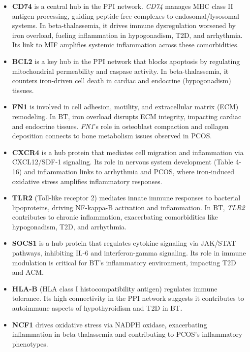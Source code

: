 \begin{itemize}
    \item \textbf{CD74} is a central hub in the PPI network. \textit{CD74} manages MHC class II antigen processing, guiding peptide-free complexes to endosomal/lysosomal systems. In beta-thalassemia, it drives immune dysregulation worsened by iron overload, fueling inflammation in hypogonadism, T2D, and arrhythmia. Its link to MIF amplifies systemic inflammation across these comorbidities.
    
    \item \textbf{BCL2} is a key hub in the PPI network that blocks apoptosis by regulating mitochondrial permeability and caspase activity. In beta-thalassemia, it counters iron-driven cell death in cardiac and endocrine (hypogonadism) tissues.
    
    \item \textbf{FN1} is involved in cell adhesion, motility, and extracellular matrix (ECM) remodeling. In BT, iron overload disrupts ECM integrity, impacting cardiac and endocrine tissues. \textit{FN1}'s role in osteoblast compaction and collagen deposition connects to bone metabolism issues observed in PCOS. 
    
    \item \textbf{CXCR4} is a hub protein that mediates cell migration and inflammation via CXCL12/SDF-1 signaling. Its role in nervous system development (Table 4-16) and inflammation links to arrhythmia and PCOS, where iron-induced oxidative stress amplifies inflammatory responses. 
    
    \item \textbf{TLR2} (Toll-like receptor 2) mediates innate immune responses to bacterial lipoproteins, driving NF-kappa-B activation and inflammation. In BT, \textit{TLR2} contributes to chronic inflammation, exacerbating comorbidities like hypogonadism, T2D, and arrhythmia. 
    
    \item \textbf{SOCS1} is a hub protein that regulates cytokine signaling via JAK/STAT pathways, inhibiting IL-6 and interferon-gamma signaling. Its role in immune modulation is critical for BT's inflammatory environment, impacting T2D and ACM. 
    
    \item \textbf{HLA-B} (HLA class I histocompatibility antigen) regulates immune tolerance. Its high connectivity in the PPI network suggests it contributes to autoimmune aspects of hypothyroidism and T2D in BT. 
    
    \item \textbf{NCF1} drives oxidative stress via NADPH oxidase, exacerbating inflammation in beta-thalassemia and contributing to PCOS's inflammatory phenotypes.
\end{itemize}


